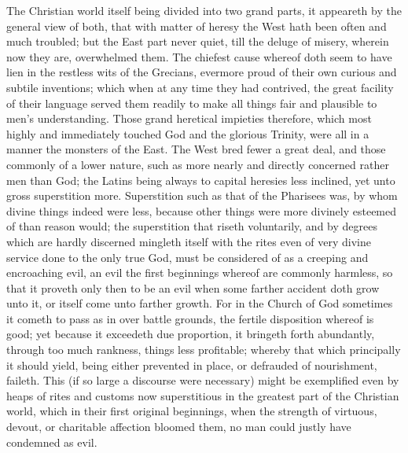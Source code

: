 The Christian world itself being divided into two grand parts, it appeareth by the general view of both, that with matter of heresy the West hath been often and much troubled; but the East part never quiet, till the deluge of misery, wherein now they are, overwhelmed them. The chiefest cause whereof doth seem to have lien in the restless wits of the Grecians, evermore proud of their own curious and subtile inventions; which when at any time they had contrived, the great facility of their language served them readily to make all things fair and plausible to men’s understanding. Those grand heretical impieties therefore, which most highly and immediately touched God and the glorious Trinity, were all in a manner the monsters of the East. The West bred fewer a great deal, and those commonly of a lower nature, such as more nearly and directly concerned rather men than God; the Latins being always to capital heresies less inclined, yet unto gross superstition more.
Superstition such as that of the Pharisees was, by whom divine things indeed were less, because other things were more divinely esteemed of than reason would; the superstition that riseth voluntarily, and by degrees which are hardly discerned mingleth itself with the rites even of very divine service done to the only true God, must be considered of as a creeping and encroaching evil, an evil the first beginnings whereof are commonly harmless, so that it proveth only then to be an evil when some farther accident doth grow unto it, or itself come unto farther growth. For in the Church of God sometimes it cometh to pass as in over battle grounds, the fertile disposition whereof is good; yet because it exceedeth due proportion, it bringeth forth abundantly, through too much rankness, things less profitable; whereby that which principally it should yield, being either prevented in place, or defrauded of nourishment, faileth. This (if so large a discourse were necessary) might be exemplified even by heaps of rites and customs now superstitious in the greatest part of the Christian world, which in their first original beginnings, when the strength of virtuous,  devout, or charitable affection bloomed them, no man could justly have condemned as evil.

